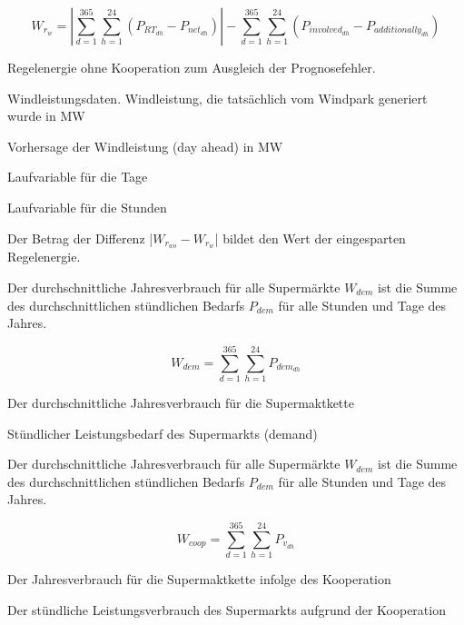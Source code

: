 \begin{equation}
W_{r_{w}} = |\sum^{365}_{d=1}\sum^{24}_{h=1}(P_{RT_{dh}}-P_{net_{dh}})| -
\sum^{365}_{d=1}\sum^{24}_{h=1}(P_{involved_{dh}} - P_{additionally_{dh}})
\label{eq:wrw}
\end{equation}

\begin{description}[\dth]
\item[$W_{r_{wo}}$] Regelenergie ohne Kooperation zum Ausgleich der
Prognosefehler.
\item[$P_{RT}$] Windleistungsdaten. Windleistung, die tats\"achlich vom
Windpark generiert wurde in MW
\item[$P_{DA}$] Vorhersage der Windleistung (day ahead) in MW
\item[$d$] Laufvariable f\"ur die Tage
\item[$h$] Laufvariable f\"ur die Stunden
\end{description}

Der Betrag der Differenz |$W_{r_{wo}}- W_{r_{w}}$| bildet den Wert der
eingesparten Regelenergie.

Der durchschnittliche Jahresverbrauch f\"ur alle Superm\"arkte $W_{dem}$ ist die
Summe des durchschnittlichen st\"undlichen Bedarfs $P_{dem}$ f\"ur alle Stunden
und Tage des Jahres.

\begin{equation}
W_{dem} = \sum^{365}_{d=1}\sum^{24}_{h=1}P_{dem_{dh}}
\label{eq:wdem}
\end{equation}

\begin{description}[\dth]
\item[$W_{dem}$] Der durchschnittliche Jahresverbrauch f\"ur die Supermaktkette
\item[$P_{dem}$] St\"undlicher Leistungsbedarf des Supermarkts (demand)
\end{description}

Der durchschnittliche Jahresverbrauch f\"ur alle Superm\"arkte $W_{dem}$ ist die
Summe des durchschnittlichen st\"undlichen Bedarfs $P_{dem}$ f\"ur alle Stunden
und Tage des Jahres.

\begin{equation}
W_{coop} = \sum^{365}_{d=1}\sum^{24}_{h=1}P_{v_{dh}}
\label{eq:wcoop}
\end{equation}

\begin{description}[\dth]
\item[$W_{coop}$] Der Jahresverbrauch f\"ur die Supermaktkette infolge des
Kooperation
\item[$P_{v}$] Der st\"undliche Leistungsverbrauch des Supermarkts aufgrund der
Kooperation
\end{description}

